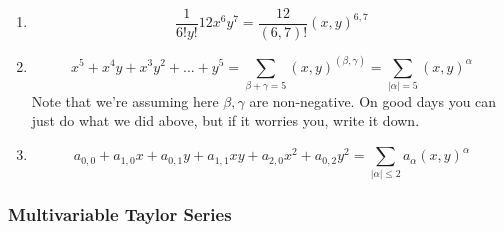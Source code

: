 \documentclass{article}
\begin{document}
\begin{enumerate}

  \item
  \begin{equation}\frac{1}{6!y!}12x^6y^7 = \frac{12}{(6, 7)!}(x, y)^{6, 7}\end{equation}

  \item
  \begin{equation}x^5 + x^4y + x^3y^2 + ... + y^5 = \sum_{\beta + \gamma = 5}(x, y)^{(\beta, \gamma)} = \sum_{|\alpha| = 5}(x, y)^\alpha\end{equation}
  Note that we're assuming here \(\beta, \gamma\) are non-negative. On good days you can just do what we did above, but if it worries you, write it down.

  \item
  \begin{equation}a_{0, 0} + a_{1, 0}x + a_{0, 1}y + a_{1, 1}xy + a_{2, 0}x^2 + a_{0, 2}y^2 = \sum_{|\alpha| \leq 2}a_{\alpha}(x, y)^{\alpha}\end{equation}

\end{enumerate}

\subsubsection{Multivariable Taylor Series}
\end{document}

